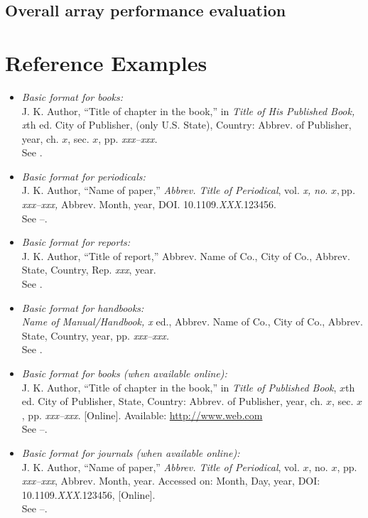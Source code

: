 \documentclass{ieeeojies}
\begin{document}
\subsection{Overall array performance evaluation}

\section{Reference Examples}

\begin{itemize}

\item \emph{Basic format for books:}\\
J. K. Author, ``Title of chapter in the book,'' in \emph{Title of His Published Book, x}th ed. City of Publisher, (only U.S. State), Country: Abbrev. of Publisher, year, ch. $x$, sec. $x$, pp. \emph{xxx--xxx.}\\
See \cite{b1,b2}.

\item \emph{Basic format for periodicals:}\\
J. K. Author, ``Name of paper,'' \emph{Abbrev. Title of Periodical}, vol. \emph{x, no}. $x, $pp\emph{. xxx--xxx, }Abbrev. Month, year, DOI. 10.1109.\emph{XXX}.123456.\\
See \cite{b3}--\cite{b5}.

\item \emph{Basic format for reports:}\\
J. K. Author, ``Title of report,'' Abbrev. Name of Co., City of Co., Abbrev. State, Country, Rep. \emph{xxx}, year.\\
See \cite{b6,b7}.

\item \emph{Basic format for handbooks:}\\
\emph{Name of Manual/Handbook, x} ed., Abbrev. Name of Co., City of Co., Abbrev. State, Country, year, pp. \emph{xxx--xxx.}\\
See \cite{b8,b9}.

\item \emph{Basic format for books (when available online):}\\
J. K. Author, ``Title of chapter in the book,'' in \emph{Title of
Published Book}, $x$th ed. City of Publisher, State, Country: Abbrev.
of Publisher, year, ch. $x$, sec. $x$, pp. \emph{xxx--xxx}. [Online].
Available: \underline{http://www.web.com}\\
See \cite{b10}--\cite{b13}.

\item \emph{Basic format for journals (when available online):}\\
J. K. Author, ``Name of paper,'' \emph{Abbrev. Title of Periodical}, vol. $x$, no. $x$, pp. \emph{xxx--xxx}, Abbrev. Month, year. Accessed on: Month, Day, year, DOI: 10.1109.\emph{XXX}.123456, [Online].\\
See \cite{b14}--\cite{b16}.


\end{itemize}
\end{document}
